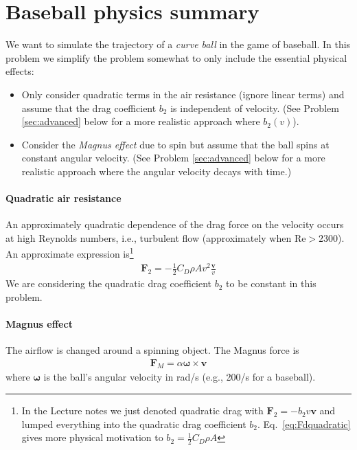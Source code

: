 \documentclass[letterpaper]{scrartcl}
\renewcommand{\vec}[1]{\ensuremath{\mathbf{#1}}}
\begin{document}
\appendix

\section{Baseball physics summary}
\label{sec:curveball}

We want to simulate the trajectory of a \emph{curve ball} in the game
of baseball. In this problem we simplify the problem somewhat to only
include the essential physical effects:
\begin{itemize}
\item Only consider quadratic terms in the air resistance (ignore
  linear terms) and assume that the drag coefficient $b_{2}$ is
  independent of velocity. (See Problem \ref{sec:advanced} below for a
  more realistic approach where $b_{2}(v)$).
\item Consider the \emph{Magnus effect} due to spin but assume that
  the ball spins at constant angular velocity. (See Problem
  \ref{sec:advanced} below for a more realistic approach where the
  angular velocity decays with time.)
\end{itemize}

\paragraph{Quadratic air resistance}

An approximately quadratic dependence of the drag force on the
velocity occurs at high Reynolds numbers, i.e., turbulent flow
(approximately when $\text{Re} > 2300$). An approximate expression
is\footnote{In the Lecture notes we just denoted quadratic drag with
  $\vec{F}_{2} = -b_2 v \vec{v}$ and lumped everything into the
  quadratic drag coefficient $b_{2}$. Eq.~\ref{eq:Fdquadratic} gives
  more physical motivation to $b_{2} = \frac{1}{2} C_{D} \rho A$}
\begin{gather}
\label{eq:Fdquadratic}
  \vec{F}_2 = -\frac{1}{2} C_{D} \rho A v^{2} \frac{\vec{v}}{v}
\end{gather}
We are considering the quadratic drag coefficient $b_{2}$ to be
constant in this problem.

\paragraph{Magnus effect}

The airflow is changed around a spinning object. The Magnus force is
\begin{gather}
  \vec{F}_M = \alpha \boldsymbol{\omega} \times \vec{v}
  \label{eq:Fmagnus}
\end{gather}
where $\boldsymbol{\omega}$ is the ball's angular velocity in rad/s
(e.g., 200/s for a baseball).
\end{document}

